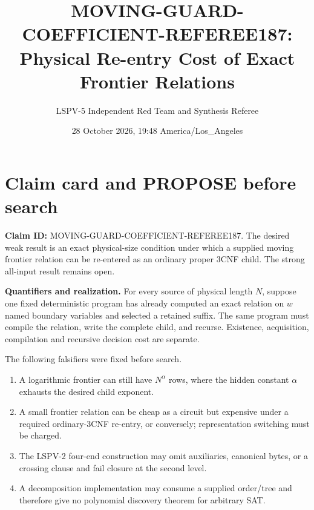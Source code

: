 \documentclass[11pt]{article}
\title{MOVING-GUARD-COEFFICIENT-REFEREE187:\\Physical Re-entry Cost of Exact Frontier Relations}
\author{LSPV-5 Independent Red Team and Synthesis Referee}
\date{28 October 2026, 19:48 America/Los\_Angeles}
\begin{document}
\maketitle

\begin{center}
\end{center}

\section{Claim card and PROPOSE before search}
\textbf{Claim ID:} MOVING-GUARD-COEFFICIENT-REFEREE187.  The desired weak
result is an exact physical-size condition under which a supplied moving
frontier relation can be re-entered as an ordinary proper 3CNF child.  The
strong all-input result remains open.

\textbf{Quantifiers and realization.}  For every source of physical length
$N$, suppose one fixed deterministic program has already computed an exact
relation on $w$ named boundary variables and selected a retained suffix.  The
same program must compile the relation, write the complete child, and recurse.
Existence, acquisition, compilation and recursive decision cost are separate.

The following falsifiers were fixed before search.
\begin{enumerate}
\item A logarithmic frontier can still have $N^{\alpha}$ rows, where the
hidden constant $\alpha$ exhausts the desired child exponent.
\item A small frontier relation can be cheap as a circuit but expensive under
a required ordinary-3CNF re-entry, or conversely; representation switching
must be charged.
\item The LSPV-2 four-end construction may omit auxiliaries, canonical bytes,
or a crossing clause and fail closure at the second level.
\item A decomposition implementation may consume a supplied order/tree and
therefore give no polynomial discovery theorem for arbitrary SAT.
\end{enumerate}
\end{document}
